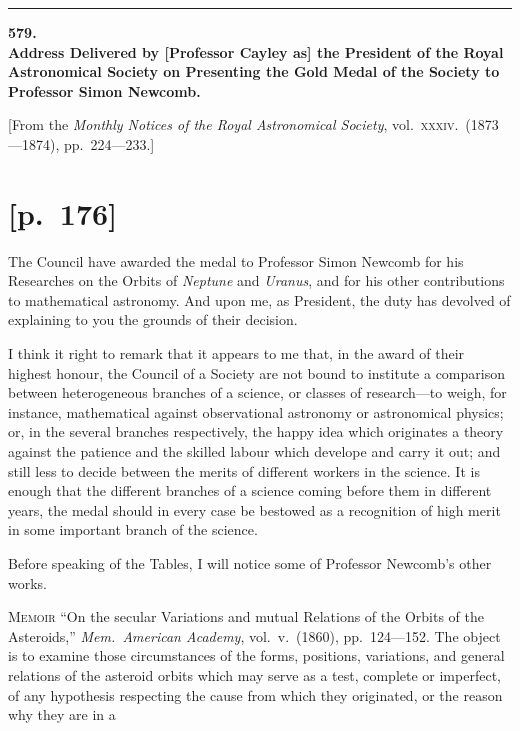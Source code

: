 \documentclass[11pt]{article}
\begin{document}
\bigskip
\hrule
\bigskip

\begin{center}
{\Large\bfseries 579.}\\[6pt]
{\Large\bfseries Address Delivered by [Professor Cayley as] the President of the Royal Astronomical Society on Presenting the Gold Medal of the Society to Professor Simon Newcomb.}
\end{center}

\bigskip
\noindent\small[From the \textit{Monthly Notices of the Royal Astronomical Society}, vol.~\textsc{xxxiv}.\ (1873---1874), pp.~224---233.]\normalsize

\section*{[p.~176]}
\noindent The Council have awarded the medal to Professor Simon Newcomb for his
Researches on the Orbits of \textit{Neptune} and \textit{Uranus}, and for his other contributions to
mathematical astronomy. And upon me, as President, the duty has devolved of explaining
to you the grounds of their decision.

I think it right to remark that it appears to me that, in the award of their
highest honour, the Council of a Society are not bound to institute a comparison
between heterogeneous branches of a science, or classes of research---to weigh, for
instance, mathematical against observational astronomy or astronomical physics; or, in
the several branches respectively, the happy idea which originates a theory against the
patience and the skilled labour which develope and carry it out; and still less to decide
between the merits of different workers in the science. It is enough that the different
branches of a science coming before them in different years, the medal should in
every case be bestowed as a recognition of high merit in some important branch of
the science.

Before speaking of the Tables, I will notice some of Professor Newcomb's other
works.

\medskip
\noindent\textsc{Memoir} ``On the secular Variations and mutual Relations of the Orbits of the
Asteroids,'' \textit{Mem.\ American Academy}, vol.~v.\ (1860), pp.~124---152. The object is to
examine those circumstances of the forms, positions, variations, and general relations of
the asteroid orbits which may serve as a test, complete or imperfect, of any hypothesis
respecting the cause from which they originated, or the reason why they are in a
\end{document}
